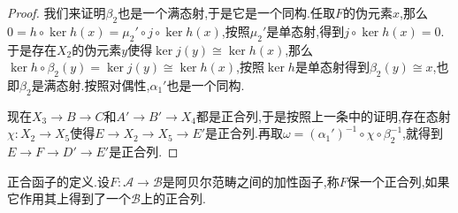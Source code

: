 \begin{enumerate}
\begin{proof}
    	我们来证明$\beta_2$也是一个满态射,于是它是一个同构.任取$F$的伪元素$x$,那么$0=h\circ\ker h(x)=\mu_2'\circ j\circ\ker h(x)$,按照$\mu_2'$是单态射,得到$j\circ\ker h(x)=0$.于是存在$X_2$的伪元素$y$使得$\ker j(y)\cong\ker h(x)$,那么$\ker h\circ\beta_2(y)=\ker j(y)\cong\ker h(x)$,按照$\ker h$是单态射得到$\beta_2(y)\cong x$,也即$\beta_2$是满态射.按照对偶性,$\alpha_1'$也是一个同构.
    	
    	现在$X_3\to B\to C$和$A'\to B'\to X_4$都是正合列,于是按照上一条中的证明,存在态射$\chi:X_2\to X_5$使得$E\to X_2\to X_5\to E'$是正合列.再取$\omega=(\alpha_1')^{-1}\circ\chi\circ\beta_2^{-1}$,就得到$E\to F\to D'\to E'$是正合列.
    \end{proof}
\end{enumerate}

正合函子的定义.设$F:\mathscr{A}\to\mathscr{B}$是阿贝尔范畴之间的加性函子,称$F$保一个正合列,如果它作用其上得到了一个$\mathscr{B}$上的正合列.
